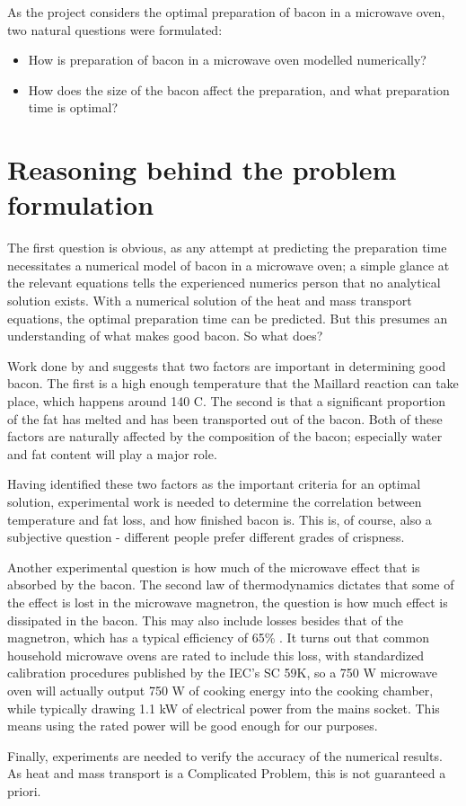 As the project considers the optimal preparation of bacon in a microwave oven, two natural questions
were formulated:

\begin{itemize}
  \item How is preparation of bacon in a microwave oven modelled numerically?
  \item How does the size of the bacon affect the preparation, and what preparation time is optimal?
\end{itemize}

\section{Reasoning behind the problem formulation}
The first question is obvious, as any attempt at predicting the preparation time necessitates a
numerical model of bacon in a microwave oven; a simple glance at the relevant
equations tells the experienced numerics person that no analytical solution
exists. With a numerical solution of the heat and mass transport equations, the
optimal preparation time can be predicted. But this presumes an understanding of
what makes good bacon. So what does?

Work done by \cite{maillard} and \cite{intarwebz} suggests that two factors are important in
determining good bacon. The first is a high enough temperature that the Maillard
reaction can take place, which happens around 140 \textdegree C. The second is that
a significant proportion of the fat has melted and has been transported out of
the bacon. Both of these factors are naturally affected by the composition of
the bacon; especially water and fat content will play a major role.

Having identified these two factors as the important criteria for an optimal
solution, experimental work is needed to determine the correlation between
temperature and fat loss, and how finished bacon is. This is, of course, also a
subjective question - different people prefer different grades of crispness.

Another experimental question is how much of the microwave effect that is
absorbed by the bacon. The second law of thermodynamics dictates that some of
the effect is lost in the microwave magnetron, the question is how much effect
is dissipated in the bacon. This may also include losses besides that of the
magnetron, which has a typical efficiency of 65\% \cite{namba}. It turns out
that common household microwave ovens are rated to include this loss,
with standardized calibration procedures published by the IEC's SC 59K, so a 750 W
microwave oven will actually output 750 W of cooking energy into the cooking
chamber, while typically drawing 1.1 kW of electrical power from the mains
socket. This means using the rated power will be good enough for our purposes.

Finally, experiments are needed to verify the accuracy of the numerical results.
As heat and mass transport is a Complicated Problem, this is not guaranteed a
priori.

\setcounter{secnumdepth}{2}
